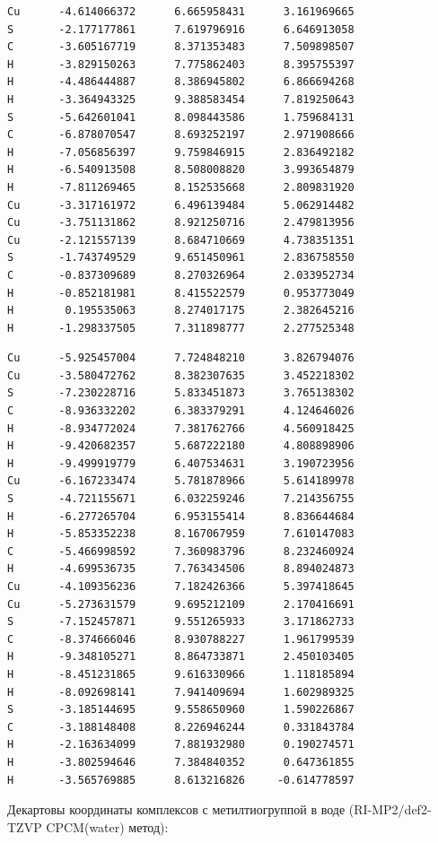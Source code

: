 \documentclass[a4paper,12pt]{article}
\begin{document}
\begin{onehalfspace}
\begin{verbatim}
	\end{verbatim}
	\begin{verbatim}
Cu      -4.614066372      6.665958431      3.161969665
S       -2.177177861      7.619796916      6.646913058
C       -3.605167719      8.371353483      7.509898507
H       -3.829150263      7.775862403      8.395755397
H       -4.486444887      8.386945802      6.866694268
H       -3.364943325      9.388583454      7.819250643
S       -5.642601041      8.098443586      1.759684131
C       -6.878070547      8.693252197      2.971908666
H       -7.056856397      9.759846915      2.836492182
H       -6.540913508      8.508008820      3.993654879
H       -7.811269465      8.152535668      2.809831920
Cu      -3.317161972      6.496139484      5.062914482
Cu      -3.751131862      8.921250716      2.479813956
Cu      -2.121557139      8.684710669      4.738351351
S       -1.743749529      9.651450961      2.836758550
C       -0.837309689      8.270326964      2.033952734
H       -0.852181981      8.415522579      0.953773049
H        0.195535063      8.274017175      2.382645216
H       -1.298337505      7.311898777      2.277525348
	\end{verbatim}
	\newpage
	\begin{verbatim}
Cu      -5.925457004      7.724848210      3.826794076
Cu      -3.580472762      8.382307635      3.452218302
S       -7.230228716      5.833451873      3.765138302
C       -8.936332202      6.383379291      4.124646026
H       -8.934772024      7.381762766      4.560918425
H       -9.420682357      5.687222180      4.808898906
H       -9.499919779      6.407534631      3.190723956
Cu      -6.167233474      5.781878966      5.614189978
S       -4.721155671      6.032259246      7.214356755
H       -6.277265704      6.953155414      8.836644684
H       -5.853352238      8.167067959      7.610147083
C       -5.466998592      7.360983796      8.232460924
H       -4.699536735      7.763434506      8.894024873
Cu      -4.109356236      7.182426366      5.397418645
Cu      -5.273631579      9.695212109      2.170416691
S       -7.152457871      9.551265933      3.171862733
C       -8.374666046      8.930788227      1.961799539
H       -9.348105271      8.864733871      2.450103405
H       -8.451231865      9.616330966      1.118185894
H       -8.092698141      7.941409694      1.602989325
S       -3.185144695      9.558650960      1.590226867
C       -3.188148408      8.226946244      0.331843784
H       -2.163634099      7.881932980      0.190274571
H       -3.802594646      7.384840352      0.647361855
H       -3.565769885      8.613216826     -0.614778597
	\end{verbatim}
	\newpage
	Декартовы координаты комплексов с метилтиогруппой в воде (RI-MP2/def2-TZVP CPCM(water) метод):
	

\end{onehalfspace}
\end{document}
